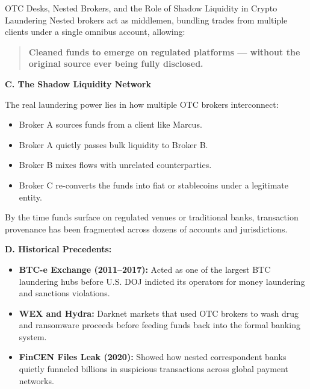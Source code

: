\begin{HistoricalSidebar}{OTC Desks, Nested Brokers, and the Role of Shadow Liquidity in Crypto Laundering}
    Nested brokers act as middlemen, bundling trades from multiple clients under a single omnibus account, allowing:
    
    \begin{quote}
    \textbf{Cleaned funds to emerge on regulated platforms — without the original source ever being fully disclosed.}
    \end{quote}
    
    \medskip
    
    \textbf{C. The Shadow Liquidity Network}
    
    The real laundering power lies in how multiple OTC brokers interconnect:
    
    \begin{itemize}
        \item Broker A sources funds from a client like Marcus.
        \item Broker A quietly passes bulk liquidity to Broker B.
        \item Broker B mixes flows with unrelated counterparties.
        \item Broker C re-converts the funds into fiat or stablecoins under a legitimate entity.
    \end{itemize}
    
    By the time funds surface on regulated venues or traditional banks, transaction provenance has been fragmented across dozens of accounts and jurisdictions.
    
    \medskip
    
    \textbf{D. Historical Precedents:}
    
    \begin{itemize}
        \item \textbf{BTC-e Exchange (2011–2017):}  
        Acted as one of the largest BTC laundering hubs before U.S. DOJ indicted its operators for money laundering and sanctions violations.
        
        \item \textbf{WEX and Hydra:}  
        Darknet markets that used OTC brokers to wash drug and ransomware proceeds before feeding funds back into the formal banking system.
        
        \item \textbf{FinCEN Files Leak (2020):}  
        Showed how nested correspondent banks quietly funneled billions in suspicious transactions across global payment networks.
    \end{itemize}
    

\end{HistoricalSidebar}
